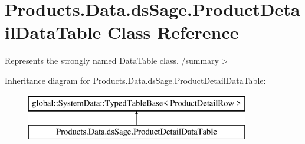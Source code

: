 \hypertarget{class_products_1_1_data_1_1ds_sage_1_1_product_detail_data_table}{}\section{Products.\+Data.\+ds\+Sage.\+Product\+Detail\+Data\+Table Class Reference}
\label{class_products_1_1_data_1_1ds_sage_1_1_product_detail_data_table}


Represents the strongly named Data\+Table class. /summary$>$  


Inheritance diagram for Products.\+Data.\+ds\+Sage.\+Product\+Detail\+Data\+Table\+:\begin{figure}[H]
\begin{center}
\leavevmode
\includegraphics[height=2.000000cm]{class_products_1_1_data_1_1ds_sage_1_1_product_detail_data_table}
\end{center}
\end{figure}
